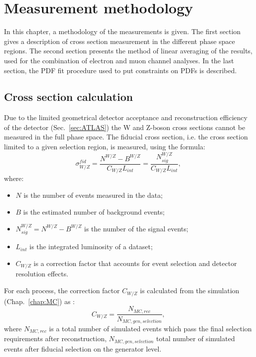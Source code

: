 \chapter{Measurement methodology}\label{chap:Met}
\minitoc

 In this chapter, a methodology of the measurements is given. The first section gives a description of cross section measurement in the different phase space regions. The second section presents the method of linear averaging of the results, used for the combination of electron and muon channel analyses. In the last section, the PDF fit procedure used to put constraints on PDFs is described.
 
\section{Cross section calculation}
Due to the limited geometrical detector acceptance and reconstruction efficiency of the \atlas detector (Sec.~\ref{sec:ATLAS}) the W and Z-boson cross sections cannot be measured in the full phase space. The fiducial cross section, i.e. the cross section limited to a given selection region, is measured, using the formula:
\begin{equation}
\sigma^{fid}_{W/Z} = \frac{N^{W/Z}-B^{W/Z}}{C_{W/Z}L_{int}}=\frac{N^{W/Z}_{sig}}{C_{W/Z}L_{int}},
\end{equation}
where:
\begin{itemize}
\item $N$ is the number of events measured in the data;
\item $B$ is the estimated number of background events;
\item $N^{W/Z}_{sig}=N^{W/Z}-B^{W/Z}$ is the number of the signal events;
\item $L_{int}$ is the integrated luminosity of a dataset;
\item $C_{W/Z}$ is a correction factor that accounts for event selection and detector resolution effects.
\end{itemize}

For each process, the correction factor $C_{W/Z}$ is calculated from the simulation (Chap.~\ref{chap:MC}) as :
\begin{equation}
C_{W/Z}=\frac{N_{MC, rec}}{N_{MC,gen, selection}}, 
\end{equation}
where $N_{MC, rec}$ is a total number of simulated events which pass the final selection requirements after reconstruction, $N_{MC,gen, selection}$ total number of simulated events after fiducial selection on the generator level.

